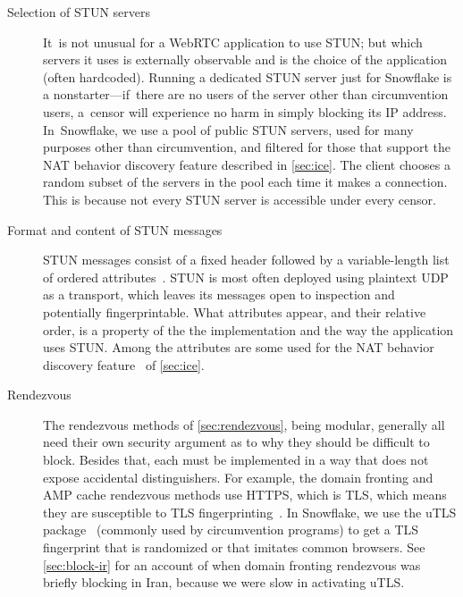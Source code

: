 \documentclass[letterpaper,twocolumn]{article}
\begin{document}
\begin{description}
\item[Selection of STUN servers]
It~is not unusual for a WebRTC application to use STUN;
but which servers it uses is externally observable
and is the choice of the application (often hardcoded).
Running a dedicated STUN server just for Snowflake is a nonstarter---if~there
are no users of the server other than circumvention users,
a~censor will experience no harm in simply blocking its IP address.
In~Snowflake, we use a pool of public STUN servers,
used for many purposes other than circumvention,
and filtered for those that support the NAT behavior discovery feature
described in \autoref{sec:ice}.
The client chooses a random subset of the servers in the pool
each time it makes a connection.
This is because not every STUN server is accessible
under every censor.

\item[Format and content of STUN messages]
STUN messages consist of a fixed header
followed by a variable-length list of ordered
attributes~\cite[\S 5]{rfc8489}.
STUN is most often deployed using plaintext UDP as a transport,
which leaves its messages open to inspection
and potentially fingerprintable.
What attributes appear,
and their relative order,
is a property of the the implementation
and the way the application uses STUN.
Among the attributes are some used
for the NAT behavior discovery feature~\cite[\S 7]{rfc5780}
of \autoref{sec:ice}.


\item[Rendezvous]
The rendezvous methods of
\autoref{sec:rendezvous},
being modular,
generally all need their own security argument
as to why they should be difficult to block.
Besides that, each must be implemented in a way
that does not expose accidental distinguishers.
For example, the domain fronting and AMP cache rendezvous methods
use HTTPS, which is TLS, which means they are susceptible to TLS fingerprinting~\cite[\S 5.1]{Fifield2015a}.
In Snowflake, we use the uTLS package~\cite[\S VII]{Frolov2019a}
(commonly used by circumvention programs)
to get a TLS fingerprint that is randomized or that imitates common browsers.
See \autoref{sec:block-ir} for an account of when
domain fronting rendezvous was briefly blocking in Iran,
because we were slow in activating uTLS.


\end{description}
\end{document}
